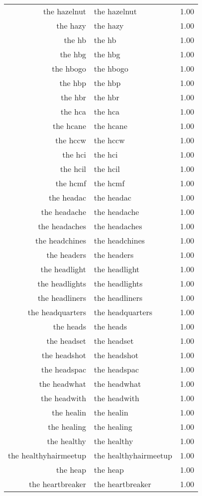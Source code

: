 \begin{table}[ht]
\begin{tabular}{rlr}
  the hazelnut & the hazelnut & 1.00 \\ 
  the hazy & the hazy & 1.00 \\ 
  the hb & the hb & 1.00 \\ 
  the hbg & the hbg & 1.00 \\ 
  the hbogo & the hbogo & 1.00 \\ 
  the hbp & the hbp & 1.00 \\ 
  the hbr & the hbr & 1.00 \\ 
  the hca & the hca & 1.00 \\ 
  the hcane & the hcane & 1.00 \\ 
  the hccw & the hccw & 1.00 \\ 
  the hci & the hci & 1.00 \\ 
  the hcil & the hcil & 1.00 \\ 
  the hcmf & the hcmf & 1.00 \\ 
  the headac & the headac & 1.00 \\ 
  the headache & the headache & 1.00 \\ 
  the headaches & the headaches & 1.00 \\ 
  the headchines & the headchines & 1.00 \\ 
  the headers & the headers & 1.00 \\ 
  the headlight & the headlight & 1.00 \\ 
  the headlights & the headlights & 1.00 \\ 
  the headliners & the headliners & 1.00 \\ 
  the headquarters & the headquarters & 1.00 \\ 
  the heads & the heads & 1.00 \\ 
  the headset & the headset & 1.00 \\ 
  the headshot & the headshot & 1.00 \\ 
  the headspac & the headspac & 1.00 \\ 
  the headwhat & the headwhat & 1.00 \\ 
  the headwith & the headwith & 1.00 \\ 
  the healin & the healin & 1.00 \\ 
  the healing & the healing & 1.00 \\ 
  the healthy & the healthy & 1.00 \\ 
  the healthyhairmeetup & the healthyhairmeetup & 1.00 \\ 
  the heap & the heap & 1.00 \\ 
  the heartbreaker & the heartbreaker & 1.00 \\ 

\end{tabular}
\end{table}
